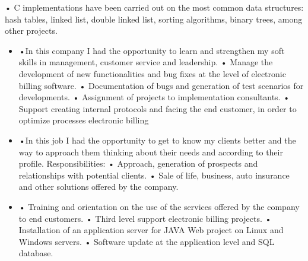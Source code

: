 \documentclass[paper=a4,fontsize=10pt,ragged2e,withhyper]{altacv}%
\begin{document}
\begin{paracol}{2}
\begin{itemize}
• C implementations have been carried out on the most common data structures: hash tables, linked list, double linked list, sorting algorithms, binary trees, among other projects. 
\end{itemize}
\divider
{}
\begin{itemize}
 \item •In this company I had the opportunity to learn and strengthen my soft skills in management, customer service and leadership.\newline%
• Manage the development of new functionalities and bug fixes at the level of electronic billing software.\newline%
• Documentation of bugs and generation of test scenarios for developments.\newline%
• Assignment of projects to implementation consultants.\newline%
• Support creating internal protocols and facing the end customer, in order to optimize processes electronic billing 
\end{itemize}
\divider
{}
\begin{itemize}
 \item •In this job I had the opportunity to get to know my clients better and the way to approach them thinking about their needs and according to their profile.\newline%
Responsibilities:\newline%
• Approach, generation of prospects and relationships with potential clients.\newline%
• Sale of life, business, auto insurance and other solutions offered by the company. 
\end{itemize}
\divider
{}
\begin{itemize}
 \item • Training and orientation on the use of the services offered by the company to end customers.\newline%
• Third level support electronic billing projects.\newline%
• Installation of an application server for JAVA Web project on Linux and Windows servers.\newline%
• Software update at the application level and SQL database.\newline%

\end{itemize}
\end{paracol}
\end{document}
